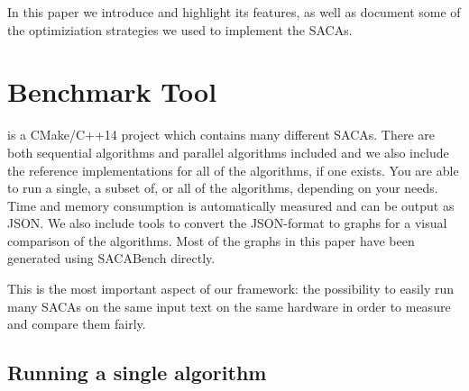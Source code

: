 In this paper we introduce \sacabench and highlight its features,
as well as document some of the optimiziation strategies we used to implement the SACAs.

\section{Benchmark Tool}

\sacabench is a CMake/C++14 project which contains many different SACAs.
There are both sequential algorithms and parallel algorithms included
and we also include the reference implementations for all of the algorithms, if one exists.
You are able to run a single, a subset of, or all of the algorithms, depending on your needs.
Time and memory consumption is automatically measured and can be output as JSON.
We also include tools to convert the JSON-format to graphs for a visual comparison of the algorithms.
Most of the graphs in this paper have been generated using SACABench directly.

This is the most important aspect of our framework:
the possibility to easily run many SACAs on the same input text on the same hardware
in order to measure and compare them fairly.

\subsection{Running a single algorithm}

